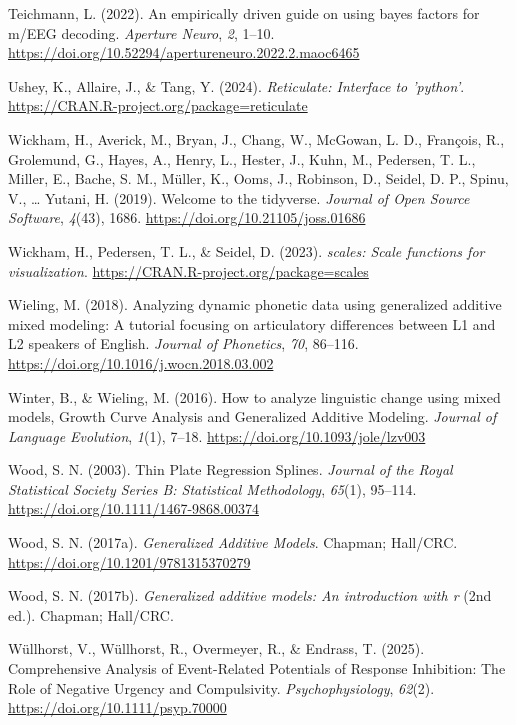 \documentclass[
  doc,
  floatsintext,
  longtable,
  a4paper,
  nolmodern,
  notxfonts,
  notimes,
  colorlinks=true,linkcolor=blue,citecolor=blue,urlcolor=blue]{apa7}
\newlength{\cslhangindent}
\newenvironment{CSLReferences}[2] %
 {\begin{list}{}{%
  \setlength{\itemindent}{0pt}
  \setlength{\leftmargin}{0pt}
  \setlength{\parsep}{0pt}
  \ifodd #1
   \setlength{\leftmargin}{\cslhangindent}
   \setlength{\itemindent}{-1\cslhangindent}
  \fi
  \setlength{\itemsep}{#2\baselineskip}}}
 {\end{list}}
\begin{document}
\begin{CSLReferences}{1}{0}
Teichmann, L. (2022). An empirically driven guide on using bayes factors
for m/EEG decoding. \emph{Aperture Neuro}, \emph{2}, 1--10.
\url{https://doi.org/10.52294/apertureneuro.2022.2.maoc6465}

Ushey, K., Allaire, J., \& Tang, Y. (2024). \emph{Reticulate: Interface
to 'python'}. \url{https://CRAN.R-project.org/package=reticulate}

Wickham, H., Averick, M., Bryan, J., Chang, W., McGowan, L. D.,
François, R., Grolemund, G., Hayes, A., Henry, L., Hester, J., Kuhn, M.,
Pedersen, T. L., Miller, E., Bache, S. M., Müller, K., Ooms, J.,
Robinson, D., Seidel, D. P., Spinu, V., \ldots{} Yutani, H. (2019).
Welcome to the {tidyverse}. \emph{Journal of Open Source Software},
\emph{4}(43), 1686. \url{https://doi.org/10.21105/joss.01686}

Wickham, H., Pedersen, T. L., \& Seidel, D. (2023). \emph{{scales}:
Scale functions for visualization}.
\url{https://CRAN.R-project.org/package=scales}

Wieling, M. (2018). Analyzing dynamic phonetic data using generalized
additive mixed modeling: A tutorial focusing on articulatory differences
between L1 and L2 speakers of English. \emph{Journal of Phonetics},
\emph{70}, 86--116. \url{https://doi.org/10.1016/j.wocn.2018.03.002}

Winter, B., \& Wieling, M. (2016). How to analyze linguistic change
using mixed models, Growth Curve Analysis and Generalized Additive
Modeling. \emph{Journal of Language Evolution}, \emph{1}(1), 7--18.
\url{https://doi.org/10.1093/jole/lzv003}

Wood, S. N. (2003). Thin Plate Regression Splines. \emph{Journal of the
Royal Statistical Society Series B: Statistical Methodology},
\emph{65}(1), 95--114. \url{https://doi.org/10.1111/1467-9868.00374}

Wood, S. N. (2017a). \emph{Generalized Additive Models}. Chapman;
Hall/CRC. \url{https://doi.org/10.1201/9781315370279}

Wood, S. N. (2017b). \emph{Generalized additive models: An introduction
with r} (2nd ed.). Chapman; Hall/CRC.

Wüllhorst, V., Wüllhorst, R., Overmeyer, R., \& Endrass, T. (2025).
Comprehensive Analysis of Event{-}Related Potentials of Response
Inhibition: The Role of Negative Urgency and Compulsivity.
\emph{Psychophysiology}, \emph{62}(2).
\url{https://doi.org/10.1111/psyp.70000}


\end{CSLReferences}
\end{document}
